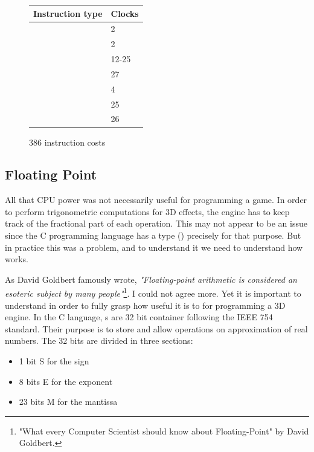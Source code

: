 \documentclass[book.tex]{subfiles}
\begin{document}
  \begin{figure}[H]
\centering  
\begin{tabularx}{\textwidth}{ X  Y }
  \toprule
  \textbf{Instruction type} &  \textbf{Clocks} \\
  \toprule 
    & 2  \\
    & 2  \\
    & 12-25\protect\footnotemark  \\
    & 27 \\
    & 4 \\
    & 25 \\
    & 26 \\
  \toprule
\end{tabularx}
\caption{386 instruction costs\protect\footnotemark}
\end{figure}
\addtocounter{footnote}{-1}





  \subsection{Floating Point}
  
   All that CPU power was not necessarily useful for programming a game. In order to perform trigonometric computations for 3D effects, the engine has to keep track of the fractional part of each operation. This may not appear to be an issue since the C programming language has a type () precisely for that purpose. But in practice this was a problem, and to understand it we need to understand how  works.\\
\par
 As David Goldbert famously wrote, \emph{"Floating-point arithmetic is considered an esoteric subject by many people"}\footnote{"What every Computer Scientist should know about Floating-Point" by David Goldbert.}. I could not agree more. Yet it is important to understand in order to fully grasp how useful it is to for programming a 3D engine. In the C language, s are 32 bit container following the IEEE 754 standard. Their purpose is to store and allow operations on approximation of real numbers. The 32 bits are divided in three sections:\\
\begin{itemize}
  \item 1 bit S for the sign
  \item 8 bits E for the exponent
  \item 23 bits M for the mantissa
\end{itemize} 
\end{document}
